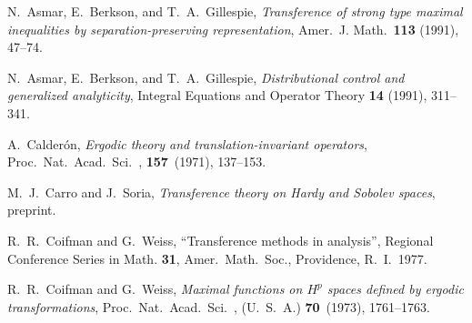 \begin{thebibliography}{Dillo 83}

  N.\ Asmar, E.\ Berkson, and T.\ A.\ Gillespie,
{\em Transference of strong type maximal 
inequalities by separation-preserving representation}, 
Amer.\ J. Math.\  {\bf 113} (1991),  47--74.

  N.\ Asmar, E.\ Berkson, and T.\ A.\ Gillespie,
{\em Distributional control and generalized analyticity},
Integral Equations and Operator Theory {\bf 14} (1991), 311--341.







  A.\ Calder\'{o}n, 
{\em Ergodic theory and translation-invariant operators}, 
Proc.\ Nat.\ Acad.\ Sci.\ , {\bf 157}\ (1971), 137--153.


  M.\ J.\ Carro and J.\ Soria,
{\em Transference theory on Hardy and Sobolev spaces},
preprint.

  R.\ R.\ Coifman and G.\ Weiss,
``Transference methods in analysis'', Regional 
Conference Series in Math. {\bf 31}, Amer.\ Math.\ Soc., 
Providence, R.\ I.\, 1977.

  R.\ R.\ Coifman and G.\ Weiss,
{\em Maximal functions on $H^p$ spaces defined by 
ergodic transformations}, 
Proc.\ Nat.\ Acad.\ Sci.\ , (U.\ S.\ A.) {\bf 70}\ (1973), 1761--1763.


\end{thebibliography}

